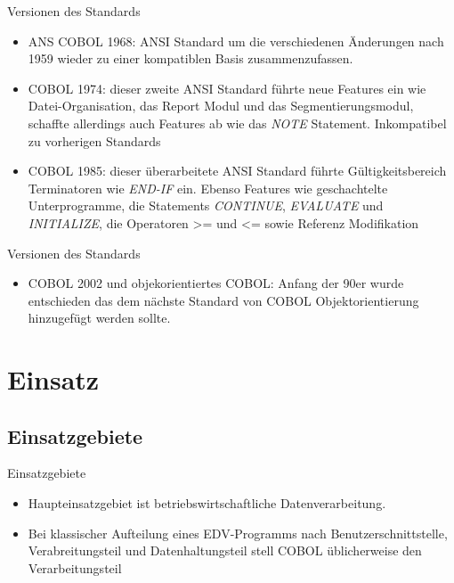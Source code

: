 \documentclass{beamer}
\begin{document}
\begin{frame}{Versionen des Standards}
  \begin{itemize}
  \item
    ANS COBOL 1968: ANSI Standard um die verschiedenen \"Anderungen nach 1959 wieder zu einer kompatiblen Basis zusammenzufassen.
  \item
    COBOL 1974: dieser zweite ANSI Standard f\"uhrte neue Features ein wie Datei-Organisation, das Report Modul und das Segmentierungsmodul, schaffte allerdings auch Features ab wie das \emph{NOTE} Statement. Inkompatibel zu vorherigen Standards
  \item
    COBOL 1985: dieser \"uberarbeitete ANSI Standard f\"uhrte G\"ultigkeitsbereich Terminatoren wie \emph{END-IF} ein. Ebenso Features wie geschachtelte Unterprogramme, die Statements \emph{CONTINUE}, \emph{EVALUATE} und \emph{INITIALIZE}, die Operatoren >= und <= sowie Referenz Modifikation
  \end{itemize}
\end{frame}

\begin{frame}{Versionen des Standards}
  \begin{itemize}
    \item
      COBOL 2002 und objekorientiertes COBOL: Anfang der 90er wurde entschieden das dem n\"achste Standard von COBOL Objektorientierung hinzugef\"ugt werden sollte.
  \end{itemize}
\end{frame}

\section{Einsatz}

\subsection{Einsatzgebiete}

\begin{frame}{Einsatzgebiete}
  \begin{itemize}
		\item
			Haupteinsatzgebiet ist betriebswirtschaftliche Datenverarbeitung.
		\item
			Bei klassischer Aufteilung eines EDV-Programms nach Benutzerschnittstelle, Verabreitungsteil und Datenhaltungsteil stell COBOL \"ublicherweise den Verarbeitungsteil
	\end{itemize}
\end{frame}
\end{document}
